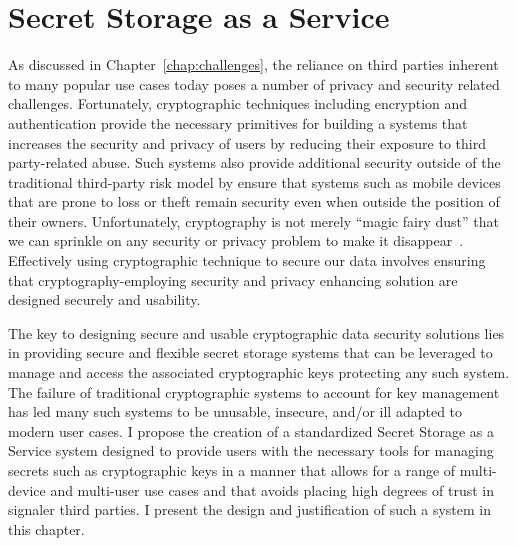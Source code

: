 \chapter{Secret Storage as a Service}
\label{chap:ssaas}

As discussed in Chapter~\ref{chap:challenges}, the reliance on third
parties inherent to many popular use cases today poses a number of
privacy and security related challenges. Fortunately, cryptographic
techniques including encryption and authentication provide the
necessary primitives for building a systems that increases the
security and privacy of users by reducing their exposure to third
party-related abuse. Such systems also provide additional security
outside of the traditional third-party risk model by ensure that
systems such as mobile devices that are prone to loss or theft remain
security even when outside the position of their
owners. Unfortunately, cryptography is not merely ``magic fairy dust''
that we can sprinkle on any security or privacy problem to make it
disappear~\cite{smith2003}. Effectively using cryptographic technique
to secure our data involves ensuring that cryptography-employing
security and privacy enhancing solution are designed securely and
usability.

The key to designing secure and usable cryptographic data security
solutions lies in providing secure and flexible secret storage systems
that can be leveraged to manage and access the associated
cryptographic keys protecting any such system. The failure of
traditional cryptographic systems to account for key management has
led many such systems to be unusable, insecure, and/or ill adapted to
modern user cases. I propose the creation of a standardized Secret
Storage as a Service system designed to provide users with the
necessary tools for managing secrets such as cryptographic keys in a
manner that allows for a range of multi-device and multi-user use
cases and that avoids placing high degrees of trust in signaler third
parties. I present the design and justification of such a system in
this chapter.
